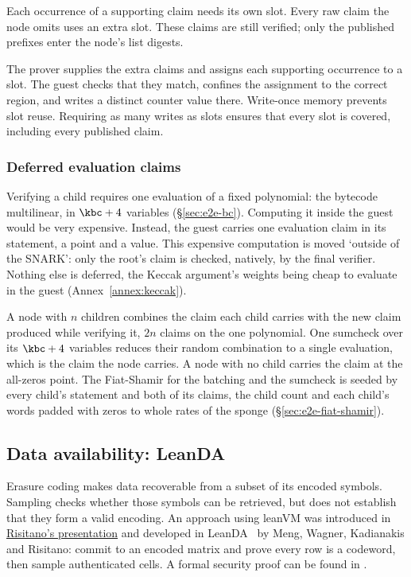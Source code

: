 Each occurrence of a supporting claim needs its own slot. Every raw claim the node omits uses an extra slot. These claims are still verified; only the published prefixes enter the node's list digests.

The prover supplies the extra claims and assigns each supporting occurrence to a slot. The guest checks that they match, confines the assignment to the correct region, and writes a distinct counter value there. Write-once memory prevents slot reuse. Requiring as many writes as slots ensures that every slot is covered, including every published claim.

\subsubsection{Deferred evaluation claims}\label{sec:deferred-claims}

Verifying a child requires one evaluation of a fixed polynomial: the bytecode multilinear, in $\kbc+4$ variables (\S\ref{sec:e2e-bc}). Computing it inside the guest would be very expensive. Instead, the guest carries one evaluation claim in its statement, a point and a value. This expensive computation is moved `outside of the SNARK': only the root's claim is checked, natively, by the final verifier. Nothing else is deferred, the Keccak argument's weights being cheap to evaluate in the guest (Annex~\ref{annex:keccak}).

A node with $n$ children combines the claim each child carries with the new claim produced while verifying it, $2n$ claims on the one polynomial. One sumcheck over its $\kbc+4$ variables reduces their random combination to a single evaluation, which is the claim the node carries. A node with no child carries the claim at the all-zeros point. The Fiat-Shamir for the batching and the sumcheck is seeded by every child's statement and both of its claims, the child count and each child's words padded with zeros to whole rates of the sponge (\S\ref{sec:e2e-fiat-shamir}).

\subsection{Data availability: LeanDA}\label{sec:leanda}

Erasure coding makes data recoverable from a subset of its encoded symbols. Sampling checks whether those symbols can be retrieved, but does not establish that they form a valid encoding. An approach using leanVM was introduced in \href{https://frisitano.github.io/slides/presentations/leanvm-fold-in-circuit-das-2026-05-08/index.html}{Risitano's presentation} and developed in LeanDA~\cite{LeanDA} by Meng, Wagner, Kadianakis and Risitano: commit to an encoded matrix and prove every row is a codeword, then sample authenticated cells. A formal security proof can be found in \cite{LeanDASecurity}.

